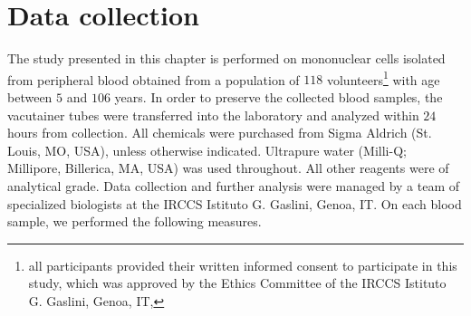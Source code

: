 \section{Data collection} \label{sec:frassoni_data_collection}

The study presented in this chapter is performed on mononuclear cells isolated from peripheral blood obtained from a population of $118$ volunteers\footnote{all participants provided their written informed consent to participate in this study, which was approved by the Ethics Committee of the IRCCS Istituto G. Gaslini, Genoa, IT, } with age between $5$ and $106$ years.
In order to preserve the collected blood samples, the vacutainer tubes were transferred into the laboratory and analyzed within $24$ hours from collection.
All chemicals were purchased from Sigma Aldrich (St. Louis, MO, USA), unless otherwise indicated. Ultrapure water (Milli-Q; Millipore, Billerica, MA, USA) was used throughout. All other reagents were of analytical grade.
Data collection and further analysis were managed by a team of specialized biologists at the IRCCS Istituto G. Gaslini, Genoa, IT. On each blood sample, we performed the following measures.


